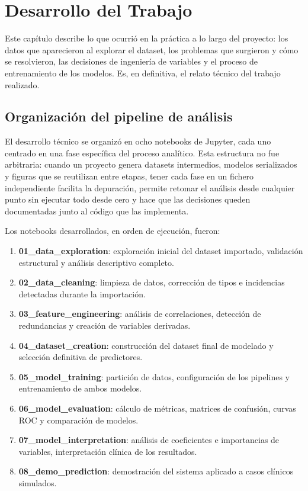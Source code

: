 \documentclass[12pt, a4paper, oneside]{report}
\begin{document}
\chapter{Desarrollo del Trabajo}
\label{chap:desarrollo}

Este capítulo describe lo que ocurrió en la práctica a lo largo del proyecto: los datos que aparecieron al explorar el dataset, los problemas que surgieron y cómo se resolvieron, las decisiones de ingeniería de variables y el proceso de entrenamiento de los modelos. Es, en definitiva, el relato técnico del trabajo realizado.

\section{Organización del pipeline de análisis}

El desarrollo técnico se organizó en ocho notebooks de Jupyter, cada uno centrado en una fase específica del proceso analítico. Esta estructura no fue arbitraria: cuando un proyecto genera datasets intermedios, modelos serializados y figuras que se reutilizan entre etapas, tener cada fase en un fichero independiente facilita la depuración, permite retomar el análisis desde cualquier punto sin ejecutar todo desde cero y hace que las decisiones queden documentadas junto al código que las implementa.

Los notebooks desarrollados, en orden de ejecución, fueron:

\begin{enumerate}
    \item \textbf{01\_data\_exploration}: exploración inicial del dataset importado, validación estructural y análisis descriptivo completo.
    \item \textbf{02\_data\_cleaning}: limpieza de datos, corrección de tipos e incidencias detectadas durante la importación.
    \item \textbf{03\_feature\_engineering}: análisis de correlaciones, detección de redundancias y creación de variables derivadas.
    \item \textbf{04\_dataset\_creation}: construcción del dataset final de modelado y selección definitiva de predictores.
    \item \textbf{05\_model\_training}: partición de datos, configuración de los pipelines y entrenamiento de ambos modelos.
    \item \textbf{06\_model\_evaluation}: cálculo de métricas, matrices de confusión, curvas ROC y comparación de modelos.
    \item \textbf{07\_model\_interpretation}: análisis de coeficientes e importancias de variables, interpretación clínica de los resultados.
    \item \textbf{08\_demo\_prediction}: demostración del sistema aplicado a casos clínicos simulados.
\end{enumerate}
\end{document}
